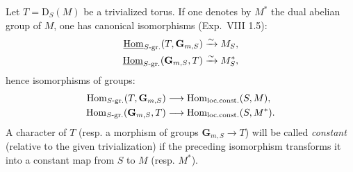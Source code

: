 \label{XXII.1.11}
Let $T=\mathrm D_S(M)$ be a trivialized torus. If one denotes by $M^*$ the dual abelian group of $M$, one has canonical isomorphisms (\cf Exp.~VIII 1.5):
\[
\begin{aligned}
\underline{\operatorname{Hom}}_{S\text{-gr.}}(T,\mathbf G_{m,S})&\xrightarrow{\sim} M_S,\\
\underline{\operatorname{Hom}}_{S\text{-gr.}}(\mathbf G_{m,S},T)&\xrightarrow{\sim} M_S^*,
\end{aligned}
\]
hence isomorphisms of groups:
\[
\begin{aligned}
\operatorname{Hom}_{S\text{-gr.}}(T,\mathbf G_{m,S})&\longrightarrow\operatorname{Hom}_{\mathrm{loc.const.}}(S,M),\\
\operatorname{Hom}_{S\text{-gr.}}(\mathbf G_{m,S},T)&\longrightarrow\operatorname{Hom}_{\mathrm{loc.const.}}(S,M^*).
\end{aligned}
\]
A character of $T$ (resp. a morphism of groups $\mathbf G_{m,S}\to T$) will be called \emph{constant} (relative to the given trivialization) if the preceding isomorphism transforms it into a constant map from $S$ to $M$ (resp. $M^*$).

